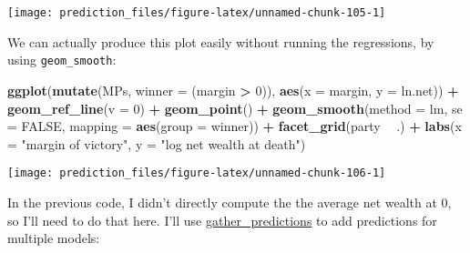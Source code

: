\documentclass[]{book}
\newenvironment{Shaded}{\begin{snugshade}}{\end{snugshade}}
\newcommand{\KeywordTok}[1]{\textcolor[rgb]{0.13,0.29,0.53}{\textbf{#1}}}
\newcommand{\DataTypeTok}[1]{\textcolor[rgb]{0.13,0.29,0.53}{#1}}
\newcommand{\DecValTok}[1]{\textcolor[rgb]{0.00,0.00,0.81}{#1}}
\newcommand{\StringTok}[1]{\textcolor[rgb]{0.31,0.60,0.02}{#1}}
\newcommand{\CommentTok}[1]{\textcolor[rgb]{0.56,0.35,0.01}{\textit{#1}}}
\newcommand{\OtherTok}[1]{\textcolor[rgb]{0.56,0.35,0.01}{#1}}
\newcommand{\OperatorTok}[1]{\textcolor[rgb]{0.81,0.36,0.00}{\textbf{#1}}}
\newcommand{\NormalTok}[1]{#1}
\theoremstyle{definition}
\theoremstyle{definition}
\theoremstyle{definition}
\theoremstyle{remark}
\begin{document}
\begin{center}\texttt{[image: prediction\_files/figure-latex/unnamed-chunk-105-1]} \end{center}

We can actually produce this plot easily without running the
regressions, by using \texttt{geom\_smooth}:

\begin{Shaded}
\begin{Highlighting}[]
\KeywordTok{ggplot}\NormalTok{(}\KeywordTok{mutate}\NormalTok{(MPs, }\DataTypeTok{winner =}\NormalTok{ (margin }\OperatorTok{>}\StringTok{ }\DecValTok{0}\NormalTok{)),}
       \KeywordTok{aes}\NormalTok{(}\DataTypeTok{x =}\NormalTok{ margin, }\DataTypeTok{y =}\NormalTok{ ln.net)) }\OperatorTok{+}
\StringTok{  }\KeywordTok{geom_ref_line}\NormalTok{(}\DataTypeTok{v =} \DecValTok{0}\NormalTok{) }\OperatorTok{+}
\StringTok{  }\KeywordTok{geom_point}\NormalTok{() }\OperatorTok{+}
\StringTok{  }\KeywordTok{geom_smooth}\NormalTok{(}\DataTypeTok{method =}\NormalTok{ lm, }\DataTypeTok{se =} \OtherTok{FALSE}\NormalTok{, }\DataTypeTok{mapping =} \KeywordTok{aes}\NormalTok{(}\DataTypeTok{group =}\NormalTok{ winner)) }\OperatorTok{+}
\StringTok{  }\KeywordTok{facet_grid}\NormalTok{(party }\OperatorTok{~}\StringTok{ }\NormalTok{.) }\OperatorTok{+}
\StringTok{  }\KeywordTok{labs}\NormalTok{(}\DataTypeTok{x =} \StringTok{"margin of victory"}\NormalTok{, }\DataTypeTok{y =} \StringTok{"log net wealth at death"}\NormalTok{)}
\end{Highlighting}
\end{Shaded}

\begin{center}\texttt{[image: prediction\_files/figure-latex/unnamed-chunk-106-1]} \end{center}

In the previous code, I didn't directly compute the the average net
wealth at 0, so I'll need to do that here. I'll use
\href{https://www.rdocumentation.org/packages/modelr/topics/gather_predictions}{gather\_predictions}
to add predictions for multiple models:

\begin{Shaded}
\end{Shaded}
\end{document}
